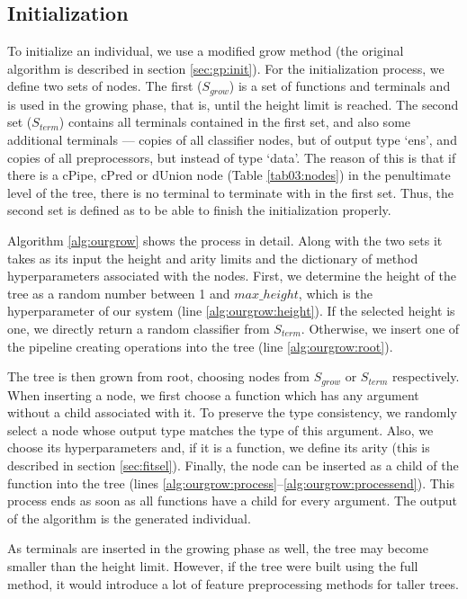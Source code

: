 \subsection{Initialization} \label{sec:init}
To initialize an individual, we use a modified grow method (the original algorithm
is described in section \ref{sec:gp:init}). For the initialization process, we
define two sets of nodes. The first ($S_{grow}$) is a set of functions and terminals and is used
in the growing phase, that is, until the height limit is reached. The second set ($S_{term}$)
contains all terminals contained in the first set, and also some additional
terminals --- copies of all classifier nodes, but of output type `ens', and copies
of all preprocessors, but instead of type `data'. The reason of this is that if
there is a cPipe, cPred or dUnion node (Table \ref{tab03:nodes}) in the penultimate level of the tree, there
is no terminal to terminate with in the first set. Thus, the second set is defined
as to be able to finish the initialization properly.

Algorithm \ref{alg:ourgrow} shows the process in detail. Along with the two sets it
takes as its input the height and arity limits and the dictionary of method hyperparameters
associated with the nodes.
First, we determine the height of the tree as a random number between 1 and
$max\_height$, which is the hyperparameter of our system
(line \ref{alg:ourgrow:height}). If the selected height is one, we directly return
a random classifier from $S_{term}$. Otherwise, we insert one of the pipeline
creating operations into the tree (line \ref{alg:ourgrow:root}).

The tree is then grown from root, choosing nodes from $S_{grow}$ or $S_{term}$
respectively. When inserting a node, we first choose a function which has any argument
without a child associated with it. To preserve the type consistency, we randomly
select a node whose output type matches the type of this argument. Also, we choose
its hyperparameters and, if it is a function, we define its arity (this is
described in section \ref{sec:fitsel}). Finally, the node can be inserted as a child
of the function into the tree
(lines \ref{alg:ourgrow:process}--\ref{alg:ourgrow:processend}). This process ends
as soon as all functions have a child for every argument. The output of the algorithm
is the generated individual.

As terminals are inserted in the growing phase as well, the tree may become
smaller than the height limit. However, if the tree were built using the full
method, it would introduce a lot of feature preprocessing methods for taller
trees.

